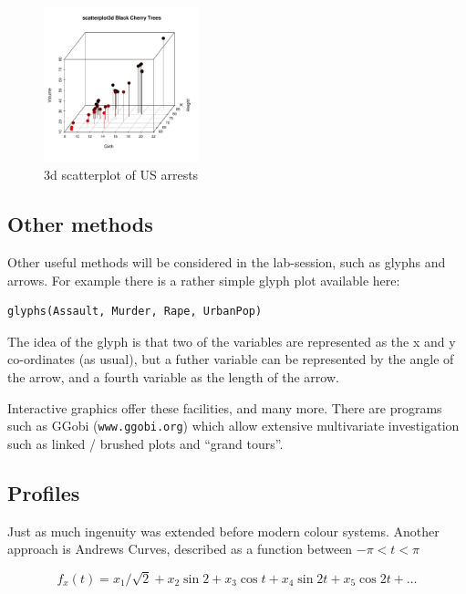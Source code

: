 \begin{figure}
\begin{center}
\includegraphics[width = 0.4\textwidth]{images/scat3d}
\caption{3d scatterplot of US arrests}
\end{center}
\end{figure}


\subsection{Other methods}

Other useful methods will be considered in the lab-session, such as glyphs and arrows.   For example there is a rather simple glyph plot available here:

\begin{verbatim}
glyphs(Assault, Murder, Rape, UrbanPop)
\end{verbatim}

The idea of the glyph is that two of the variables are represented as the x and y co-ordinates (as usual), but a futher variable can be represented by the angle of the arrow, and a fourth variable as the length of the arrow.

Interactive graphics offer these facilities, and many more.   There are programs such as GGobi (\texttt{www.ggobi.org}) which allow extensive multivariate investigation such as linked / brushed plots and ``grand tours''.   

\subsection{Profiles}

Just as much ingenuity was extended before modern colour systems.   Another approach is Andrews Curves, described as a function between $-\pi < t < \pi$


\begin{displaymath}
f_{x}(t) = x_{1}/\sqrt 2 + x_{2} \sin 2 + x_{3} \cos t + x_{4} \sin 2t + x_{5} \cos 2t + \ldots
\end{displaymath}

